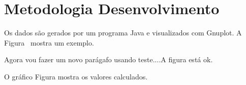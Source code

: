 \section{Metodologia
Desenvolvimento}

Os dados são gerados por um programa Java e visualizados com Gnuplot. A Figura~ mostra um exemplo.



\vspace{5cm}

Agora vou fazer um novo parágafo usando teste....A figura está ok.



O gráfico Figura  mostra os valores calculados.

